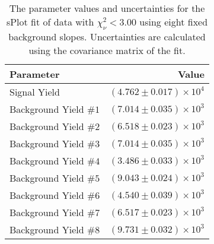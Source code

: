 
\begin{table}[ht]
    \begin{center}
        \begin{tabular}{lr}\toprule
            Parameter & Value \\\midrule
            Signal Yield & $(4.762 \pm 0.017) \times 10^{4}$ \\
            Background Yield $\#1$ & $(7.014 \pm 0.035) \times 10^{3}$ \\
            Background Yield $\#2$ & $(6.518 \pm 0.023) \times 10^{3}$ \\
            Background Yield $\#3$ & $(7.014 \pm 0.035) \times 10^{3}$ \\
            Background Yield $\#4$ & $(3.486 \pm 0.033) \times 10^{3}$ \\
            Background Yield $\#5$ & $(9.043 \pm 0.024) \times 10^{3}$ \\
            Background Yield $\#6$ & $(4.540 \pm 0.039) \times 10^{3}$ \\
            Background Yield $\#7$ & $(6.517 \pm 0.023) \times 10^{3}$ \\
            Background Yield $\#8$ & $(9.731 \pm 0.032) \times 10^{3}$ \\\bottomrule
        \end{tabular}
        \caption{The parameter values and uncertainties for the sPlot fit of data with $\chi^2_\nu < 3.00$ using eight fixed background slopes. Uncertainties are calculated using the covariance matrix of the fit.}\label{tab:splot-fit-results-chisqdof-3.00-fixed-8}
    \end{center}
\end{table}
